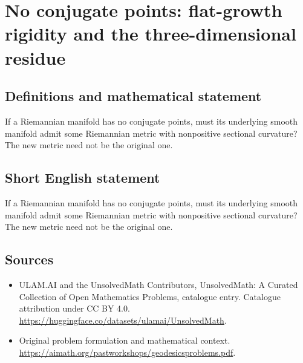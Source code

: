 \documentclass[11pt]{article}
\begin{document}
\section{No conjugate points: flat-growth rigidity and the three-dimensional residue}\label{statement}

\subsection{Definitions and mathematical statement}
If a Riemannian manifold has no conjugate points, must its underlying smooth manifold admit some Riemannian metric with nonpositive sectional curvature? The new metric need not be the original one.
\subsection{Short English statement}
If a Riemannian manifold has no conjugate points, must its underlying smooth manifold admit some Riemannian metric with nonpositive sectional curvature? The new metric need not be the original one.
\subsection{Sources}
\begin{itemize}
\item[\hypertarget{source:statement:1}{S1}] ULAM.AI and the UnsolvedMath Contributors, UnsolvedMath: A Curated Collection of Open Mathematics Problems, catalogue entry. Catalogue attribution under CC BY 4.0.
\url{https://huggingface.co/datasets/ulamai/UnsolvedMath}.
\item[\hypertarget{source:statement:2}{S2}] Original problem formulation and mathematical context.
\url{https://aimath.org/pastworkshops/geodesicsproblems.pdf}.
\end{itemize}
\label{end:statement}
\end{document}

